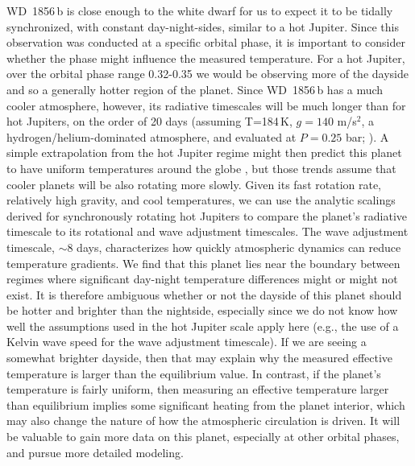 \documentclass[twocolumn]{aastex631}
\begin{document}
WD~1856\,b is close enough to the white dwarf for us to expect it to be tidally synchronized, with constant day-night-sides, similar to a hot Jupiter. Since this observation was conducted at a specific orbital phase, it is important to consider whether the phase might influence the measured temperature. For a hot Jupiter, over the orbital phase range 0.32-0.35 we would be observing more of the dayside and so a generally hotter region of the planet. Since WD~1856\,b has a much cooler atmosphere, however, its radiative timescales will be much longer than for hot Jupiters, on the order of 20 days (assuming T=184\,K, $g=140$ m/s$^2$, a hydrogen/helium-dominated atmosphere, and evaluated at $P=0.25$ bar; \citealt{Showman2002}). A simple extrapolation from the hot Jupiter regime might then predict this planet to have uniform temperatures around the globe \citep{Komacek2016}, but those trends assume that cooler planets will be also rotating more slowly. 
Given its fast rotation rate, relatively high gravity, and cool temperatures, we can use the analytic scalings derived for synchronously rotating hot Jupiters \citep{PerezBecker2013,Komacek2016} to compare the planet's radiative timescale to its rotational and wave adjustment timescales. The wave adjustment timescale, $\sim$8 days, characterizes how quickly atmospheric dynamics can reduce temperature gradients. We find that this planet lies near the boundary between regimes where significant day-night temperature differences might or might not exist.
It is therefore ambiguous whether or not the dayside of this planet should be hotter and brighter than the nightside, especially since we do not know how well the assumptions used in the hot Jupiter scale apply here (e.g., the use of a Kelvin wave speed for the wave adjustment timescale). If we are seeing a somewhat brighter dayside, then that may explain why the measured effective temperature is larger than the equilibrium value. In contrast, if the planet's temperature is fairly uniform, then measuring an effective temperature larger than equilibrium implies some significant heating from the planet interior, which may also change the nature of how the atmospheric circulation is driven. It will be valuable to gain more data on this planet, especially at other orbital phases, and pursue more detailed modeling.



{}

\end{document}
